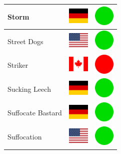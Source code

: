 \documentclass[12pt, a4paper, twoside]{report}
\begin{document}
\begin{center}
\begin{longtable}{|p{5cm}|p{2cm}|p{2cm}|}
Storm & \includegraphics[width=1cm]{4x3/de} & \includegraphics[width=1cm]{likes/y} \\ \hline
Street Dogs & \includegraphics[width=1cm]{4x3/us} & \includegraphics[width=1cm]{likes/y} \\ \hline
Striker & \includegraphics[width=1cm]{4x3/ca} & \includegraphics[width=1cm]{likes/n} \\ \hline
Sucking Leech & \includegraphics[width=1cm]{4x3/de} & \includegraphics[width=1cm]{likes/y} \\ \hline
Suffocate Bastard & \includegraphics[width=1cm]{4x3/de} & \includegraphics[width=1cm]{likes/y} \\ \hline
Suffocation & \includegraphics[width=1cm]{4x3/us} & \includegraphics[width=1cm]{likes/y} \\ \hline

\end{longtable}
\end{center}
\end{document}
